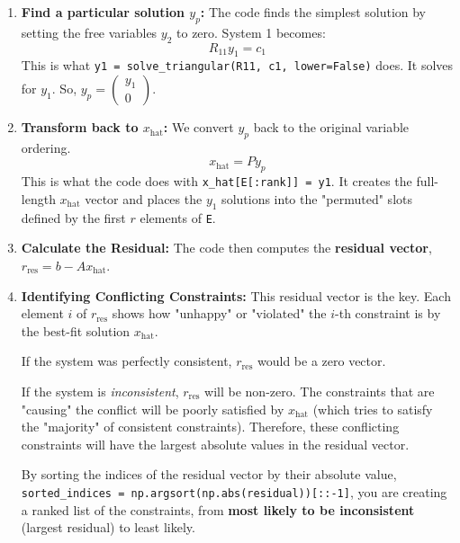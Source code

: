 \documentclass[11pt, a4paper]{article}
\begin{document}
\begin{enumerate}
    \item \textbf{Find a particular solution $y_p$:} The code finds the simplest solution by setting the free variables $y_2$ to zero. System 1 becomes:
    $$
    R_{11} y_1 = c_1
    $$
    This is what \texttt{y1 = solve\_triangular(R11, c1, lower=False)} does. It solves for $y_1$.
    So, $y_p = \begin{pmatrix} y_1 \\ 0 \end{pmatrix}$.
    
    \item \textbf{Transform back to $x_{\text{hat}}$:} We convert $y_p$ back to the original variable ordering.
    $$
    x_{\text{hat}} = P y_p
    $$
    This is what the code does with \texttt{x\_hat[E[:rank]] = y1}. It creates the full-length $x_{\text{hat}}$ vector and places the $y_1$ solutions into the "permuted" slots defined by the first $r$ elements of \texttt{E}.
    
    \item \textbf{Calculate the Residual:} The code then computes the \textbf{residual vector}, $r_{\text{res}} = b - Ax_{\text{hat}}$.
    
    \item \textbf{Identifying Conflicting Constraints:} This residual vector is the key. Each element $i$ of $r_{\text{res}}$ shows how "unhappy" or "violated" the $i$-th constraint is by the best-fit solution $x_{\text{hat}}$.
    
    If the system was perfectly consistent, $r_{\text{res}}$ would be a zero vector.
    
    If the system is \textit{inconsistent}, $r_{\text{res}}$ will be non-zero. The constraints that are "causing" the conflict will be poorly satisfied by $x_{\text{hat}}$ (which tries to satisfy the "majority" of consistent constraints). Therefore, these conflicting constraints will have the largest absolute values in the residual vector.
    
    By sorting the indices of the residual vector by their absolute value, \texttt{sorted\_indices = np.argsort(np.abs(residual))[::-1]}, you are creating a ranked list of the constraints, from \textbf{most likely to be inconsistent} (largest residual) to least likely.
\end{enumerate}
\end{document}
